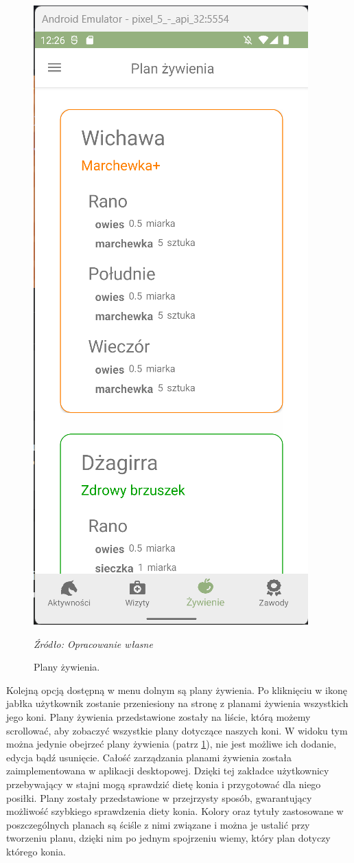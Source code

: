 \documentclass[12pt,oneside]{report}
\begin{document}
\newpage
\begin{figure}
	\centering
	\includegraphics[scale=0.7]{NutritionPlan}
	\caption{\centering Plany żywienia.}
	\textit{Źródło: Opracowanie własne}
	\label{NutritionPlan}
\end{figure}
Kolejną opcją dostępną w menu dolnym są plany żywienia. Po kliknięciu w ikonę jabłka użytkownik zostanie przeniesiony na stronę z planami żywienia wszystkich jego koni. Plany żywienia przedstawione zostały na liście, którą możemy scrollować, aby zobaczyć wszystkie plany dotyczące naszych koni. W widoku tym można jedynie obejrzeć plany żywienia (patrz \ref{NutritionPlan}), nie jest możliwe ich dodanie, edycja bądź usunięcie. Całość zarządzania planami żywienia została zaimplementowana w aplikacji desktopowej. Dzięki tej zakładce użytkownicy przebywający w stajni mogą sprawdzić dietę konia i przygotować dla niego posiłki. Plany zostały przedstawione w przejrzysty sposób, gwarantujący możliwość szybkiego sprawdzenia diety konia. Kolory oraz tytuły zastosowane w poszczególnych planach są ściśle z nimi związane i można je ustalić przy tworzeniu planu, dzięki nim po jednym spojrzeniu wiemy, który plan dotyczy którego konia. 
\end{document}
